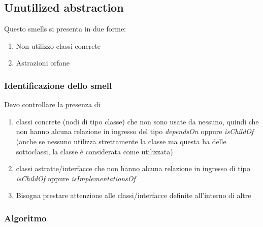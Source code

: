 \subsection{Unutilized abstraction}
Questo smells si presenta in due forme:
\begin{enumerate}
    \item Non utilizzo classi concrete
    \item Astrazioni orfane
\end{enumerate}
\subsubsection*{Identificazione dello smell}
Devo controllare la presenza di
\begin{enumerate}
    \item classi concrete (nodi di tipo classe) che non sono usate da nessuno, quindi che non hanno alcuna relazione in ingresso del tipo \textit{dependsOn} oppure \textit{isChildOf} (anche se nessuno utilizza strettamente la classe ma questa ha delle sottoclassi, la classe è considerata come utilizzata) 
    \item classi astratte/interfacce che non hanno alcuna relazione in ingresso di tipo \textit{isChildOf} oppure \textit{isImplementationsOf}
    \item Bisogna prestare attenzione alle classi/interfacce definite all'interno di altre
\end{enumerate}
\subsubsection*{Algoritmo}
